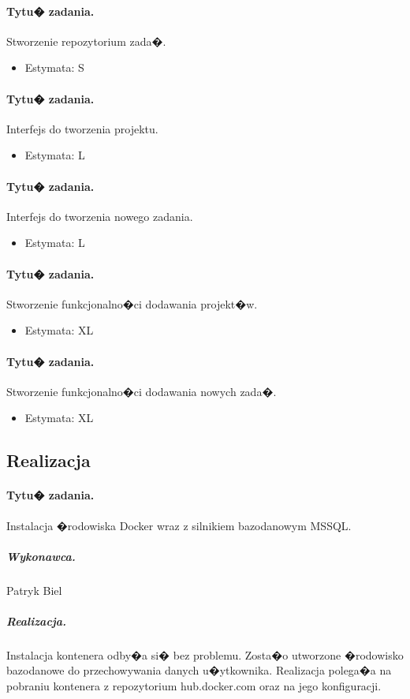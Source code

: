 ﻿\documentclass[a4paper]{article}
\begin{document}
\paragraph{Tytu� zadania.} Stworzenie repozytorium zada�.
\begin{itemize}
\item Estymata: S
\end{itemize}

\paragraph{Tytu� zadania.} Interfejs do tworzenia projektu.
\begin{itemize}
\item Estymata: L
\end{itemize}

\paragraph{Tytu� zadania.} Interfejs do tworzenia nowego zadania.
\begin{itemize}
\item Estymata: L
\end{itemize}

\paragraph{Tytu� zadania.} Stworzenie funkcjonalno�ci dodawania projekt�w.
\begin{itemize}
\item Estymata: XL
\end{itemize}

\paragraph{Tytu� zadania.} Stworzenie funkcjonalno�ci dodawania nowych zada�.
\begin{itemize}
\item Estymata: XL
\end{itemize}


\subsection{Realizacja}

\paragraph{Tytu� zadania.} Instalacja �rodowiska Docker wraz z silnikiem bazodanowym MSSQL.
\subparagraph{Wykonawca.} Patryk Biel
\subparagraph{Realizacja.} Instalacja kontenera odby�a si� bez problemu. Zosta�o utworzone �rodowisko bazodanowe do przechowywania danych u�ytkownika. Realizacja polega�a na pobraniu kontenera z repozytorium hub.docker.com oraz na jego konfiguracji.
\end{document}
